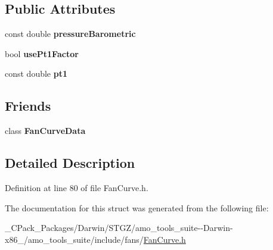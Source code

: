 \subsection*{Public Attributes}
\begin{DoxyCompactItemize}
\item 
\mbox{\label{struct_fan_curve_data_1_1_base_operating_point_ab66cd337152255bf82b7ef98f828144b}} 
const double {\bfseries pressure\+Barometric}
\item 
\mbox{\label{struct_fan_curve_data_1_1_base_operating_point_a4d09155765f22458b9feb10d77a188de}} 
bool {\bfseries use\+Pt1\+Factor}
\item 
\mbox{\label{struct_fan_curve_data_1_1_base_operating_point_ab349de155902de5f1a2c6dc6f48191b3}} 
const double {\bfseries pt1}
\end{DoxyCompactItemize}
\subsection*{Friends}
\begin{DoxyCompactItemize}
\item 
\mbox{\label{struct_fan_curve_data_1_1_base_operating_point_a6c0df668730aa3a6673d279f2bbe7799}} 
class {\bfseries Fan\+Curve\+Data}
\end{DoxyCompactItemize}


\subsection{Detailed Description}


Definition at line 80 of file Fan\+Curve.\+h.



The documentation for this struct was generated from the following file\+:\begin{DoxyCompactItemize}
\item 
\+\_\+\+C\+Pack\+\_\+\+Packages/\+Darwin/\+S\+T\+G\+Z/amo\+\_\+tools\+\_\+suite-\/-\/\+Darwin-\/x86\+\_/amo\+\_\+tools\+\_\+suite/include/fans/\hyperlink{___c_pack___packages_2_darwin_2_s_t_g_z_2amo__tools__suite--_darwin-x86__64_2amo__tools__suite_2include_2fans_2_fan_curve_8h}{Fan\+Curve.\+h}\end{DoxyCompactItemize}
